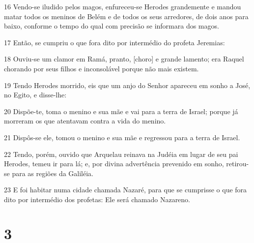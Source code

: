 \par 16 Vendo-se iludido pelos magos, enfureceu-se Herodes grandemente e mandou matar todos os meninos de Belém e de todos os seus arredores, de dois anos para baixo, conforme o tempo do qual com precisão se informara dos magos.
\par 17 Então, se cumpriu o que fora dito por intermédio do profeta Jeremias:
\par 18 Ouviu-se um clamor em Ramá, pranto, [choro] e grande lamento; era Raquel chorando por seus filhos e inconsolável porque não mais existem.
\par 19 Tendo Herodes morrido, eis que um anjo do Senhor apareceu em sonho a José, no Egito, e disse-lhe:
\par 20 Dispõe-te, toma o menino e sua mãe e vai para a terra de Israel; porque já morreram os que atentavam contra a vida do menino.
\par 21 Dispôs-se ele, tomou o menino e sua mãe e regressou para a terra de Israel.
\par 22 Tendo, porém, ouvido que Arquelau reinava na Judéia em lugar de seu pai Herodes, temeu ir para lá; e, por divina advertência prevenido em sonho, retirou-se para as regiões da Galiléia.
\par 23 E foi habitar numa cidade chamada Nazaré, para que se cumprisse o que fora dito por intermédio dos profetas: Ele será chamado Nazareno.

\chapter{3}

